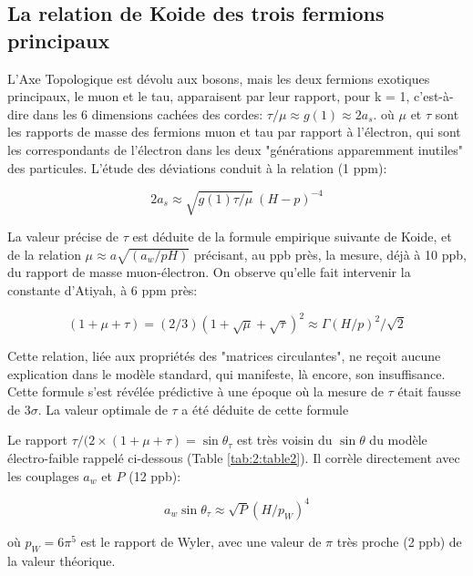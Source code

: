 \documentclass[a4paper,9pt]{article}
\begin{document}
\subsection{La relation de Koide des trois fermions principaux}
L'Axe Topologique est dévolu aux bosons, mais les deux fermions exotiques principaux, le muon et le tau, apparaisent par leur rapport, pour k = 1, c'est-à-dire dans les 6 dimensions cachées des cordes: $\tau/\mu \approx g(1) \approx 2 a_s$. où $\mu$ et $\tau$ sont les rapports de masse des fermions muon et tau par rapport à l'électron, qui sont les correspondants de l'électron dans les deux "générations apparemment inutiles" des particules. L'étude des déviations conduit à la relation (1 ppm):

\begin{equation}
2 a_s \approx \sqrt{g(1)\tau/\mu}~ (H-p)^{-4}  
\end{equation}

La valeur précise de $\tau$ est déduite de la formule empirique suivante de Koide, et de la relation $\mu \approx a\sqrt{(a_w/pH)}$ précisant, au ppb près, la mesure, déjà à 10 ppb, du rapport de masse muon-électron. On observe qu'elle fait intervenir la constante d'Atiyah, à 6 ppm près: 


\begin{equation}
(1+\mu+\tau) = (2/3)(1+\sqrt\mu+\sqrt\tau)^2 \approx \Gamma (H/p)^2 / \sqrt 2 
\end{equation}

Cette relation, liée aux propriétés des "matrices circulantes", ne reçoit aucune explication dans le modèle standard, qui manifeste, là encore, son insuffisance.
Cette formule s'est révélée prédictive à une époque où la mesure de $\tau$ était fausse de $3 \sigma$. La valeur optimale de $\tau$ a été déduite \cite{Sanchez2} de cette formule 

Le rapport $\tau/(2\times (1+\mu+\tau) = \sin\theta_{\tau} $ est très voisin du $\sin\theta$ du modèle électro-faible rappelé ci-dessous (Table \ref{tab:2:table2}). Il corrèle directement avec les couplages $a_w$ et $P$ (12 ppb):

\begin{equation}
a_{w} \sin \theta_{\tau} \approx \sqrt{P} (H/p_W)^4
\end{equation}

où $p_W = 6\pi^5$ est le rapport de Wyler, avec une valeur de $\pi$ très proche (2 ppb) de la valeur théorique.

\end{document}
